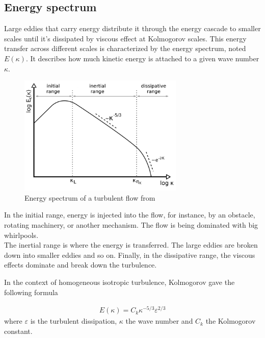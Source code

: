 \documentclass[a4paper,12pt]{article}
\theoremstyle{definition}
\begin{document}
\subsection{Energy spectrum}
Large eddies that carry energy distribute it through the energy cascade to smaller scales until it's dissipated by viscous effect at Kolmogorov scales. 
This energy transfer across different scales is characterized by the energy spectrum, noted $E(\kappa)$. It describes how much kinetic energy is attached to a given wave number $\kappa$. 
\begin{figure}[H]
    \centering
    \includegraphics[width=0.7\textwidth]{illustrations/energy-spectrum-example.png}
    \caption{Energy spectrum of a turbulent flow from \cite{phdthesisRies}}
\end{figure}

In the initial range, energy is injected into the flow, for instance, by an obstacle, rotating machinery, or another mechanism. The flow is being dominated with big whirlpools. \\
The inertial range is where the energy is transferred. The large eddies are broken down into smaller eddies and so on.  Finally, in the dissipative range, the viscous effects dominate and break down the turbulence.

\bigskip

In the context of homogeneous isotropic turbulence, Kolmogorov gave the following formula  

\begin{align}
    E(\kappa) = C_k \kappa^{-5/3}\varepsilon^{2/3}
\end{align}
where $\varepsilon$ is the turbulent dissipation, $\kappa$ the wave number and $C_k$ the Kolmogorov constant.
\end{document}
